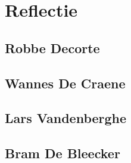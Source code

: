 
\chapter{Reflectie}
\label{ch:reflectie}

\section{Robbe Decorte}
\section{Wannes De Craene}
\section{Lars Vandenberghe}
\section{Bram De Bleecker}